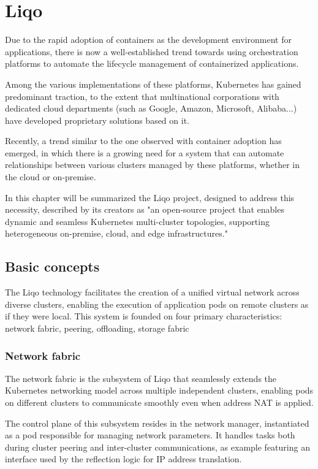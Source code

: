 \chapter{Liqo}
Due to the rapid adoption of containers as the development environment for applications, there is now a well-established trend towards using orchestration platforms to automate the lifecycle management of containerized applications. 

Among the various implementations of these platforms, Kubernetes has gained predominant traction, to the extent that multinational corporations with dedicated cloud departments (such as Google, Amazon, Microsoft, Alibaba...) have developed proprietary solutions based on it. 

Recently, a trend similar to the one observed with container adoption has emerged, in which there is a growing need for a system that can automate relationships between various clusters managed by these platforms, whether in the cloud or on-premise. 

In this chapter will be summarized the Liqo project, designed to address this necessity, described by its creators \cite{l0-1} as "an open-source project that enables dynamic and seamless Kubernetes multi-cluster topologies, supporting heterogeneous on-premise, cloud, and edge infrastructures."

\section{Basic concepts}
The Liqo technology facilitates the creation of a unified virtual network across diverse clusters, enabling the execution of application pods on remote clusters as if they were local. This system is founded on four primary characteristics: network fabric, peering, offloading, storage fabric

\subsection{Network fabric}
The network fabric is the subsystem of Liqo that seamlessly extends the Kubernetes networking model across multiple independent clusters, enabling pods on different clusters to communicate smoothly even when address NAT is applied.

The control plane of this subsystem resides in the network manager, instantiated as a pod responsible for managing network parameters. It handles tasks both during cluster peering and inter-cluster communications, as example featuring an interface used by the reflection logic for IP address translation.

